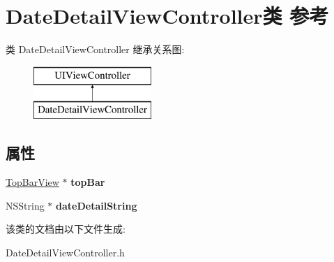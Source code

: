 \hypertarget{interface_date_detail_view_controller}{\section{Date\-Detail\-View\-Controller类 参考}
\label{interface_date_detail_view_controller}
}
类 Date\-Detail\-View\-Controller 继承关系图\-:\begin{figure}[H]
\begin{center}
\leavevmode
\includegraphics[height=2.000000cm]{interface_date_detail_view_controller}
\end{center}
\end{figure}
\subsection*{属性}
\begin{DoxyCompactItemize}
\item 
\hypertarget{interface_date_detail_view_controller_a811cfa9af8a8baec0d401a465158a70b}{\hyperlink{interface_top_bar_view}{Top\-Bar\-View} $\ast$ {\bfseries top\-Bar}}\label{interface_date_detail_view_controller_a811cfa9af8a8baec0d401a465158a70b}

\item 
\hypertarget{interface_date_detail_view_controller_aeb25dd9abcc01c3ad5f4725d4b5ee04f}{N\-S\-String $\ast$ {\bfseries date\-Detail\-String}}\label{interface_date_detail_view_controller_aeb25dd9abcc01c3ad5f4725d4b5ee04f}

\end{DoxyCompactItemize}


该类的文档由以下文件生成\-:\begin{DoxyCompactItemize}
\item 
Date\-Detail\-View\-Controller.\-h\end{DoxyCompactItemize}
